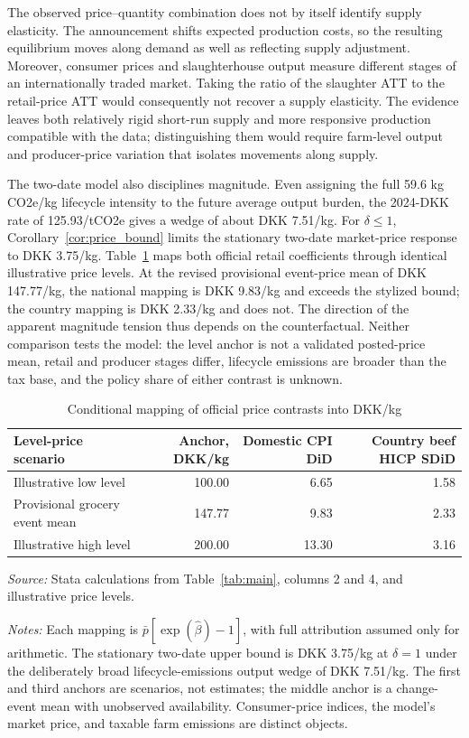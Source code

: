 \documentclass[11pt]{article}
\begin{document}
The observed price--quantity combination does not by itself identify supply elasticity. The announcement shifts expected production costs, so the resulting equilibrium moves along demand as well as reflecting supply adjustment. Moreover, consumer prices and slaughterhouse output measure different stages of an internationally traded market. Taking the ratio of the slaughter ATT to the retail-price ATT would consequently not recover a supply elasticity. The evidence leaves both relatively rigid short-run supply and more responsive production compatible with the data; distinguishing them would require farm-level output and producer-price variation that isolates movements along supply.

The two-date model also disciplines magnitude. Even assigning the full 59.6 kg CO2e/kg lifecycle intensity to the future average output burden, the 2024-DKK rate of 125.93/tCO2e gives a wedge of about DKK 7.51/kg. For $\delta\leq1$, Corollary~\ref{cor:price_bound} limits the stationary two-date market-price response to DKK 3.75/kg. Table~\ref{tab:model_magnitude} maps both official retail coefficients through identical illustrative price levels. At the revised provisional event-price mean of DKK 147.77/kg, the national mapping is DKK 9.83/kg and exceeds the stylized bound; the country mapping is DKK 2.33/kg and does not. The direction of the apparent magnitude tension thus depends on the counterfactual. Neither comparison tests the model: the level anchor is not a validated posted-price mean, retail and producer stages differ, lifecycle emissions are broader than the tax base, and the policy share of either contrast is unknown.

\begin{table}[htbp]\centering
\caption{Conditional mapping of official price contrasts into DKK/kg}\label{tab:model_magnitude}
\small
\begin{tabular}{lrrr}\toprule
Level-price scenario & Anchor, DKK/kg & Domestic CPI DiD & Country beef HICP SDiD \\\midrule
Illustrative low level & 100.00 & 6.65 & 1.58 \\
Provisional grocery event mean & 147.77 & 9.83 & 2.33 \\
Illustrative high level & 200.00 & 13.30 & 3.16 \\\bottomrule
\end{tabular}
\begin{minipage}{0.96\linewidth}\small
\textit{Source:} Stata calculations from Table~\ref{tab:main}, columns 2 and 4, and illustrative price levels.\par
\textit{Notes:} Each mapping is $\bar p[\exp(\widehat\beta)-1]$, with full attribution assumed only for arithmetic. The stationary two-date upper bound is DKK 3.75/kg at $\delta=1$ under the deliberately broad lifecycle-emissions output wedge of DKK 7.51/kg. The first and third anchors are scenarios, not estimates; the middle anchor is a change-event mean with unobserved availability. Consumer-price indices, the model's market price, and taxable farm emissions are distinct objects.\end{minipage}
\end{table}
\end{document}

